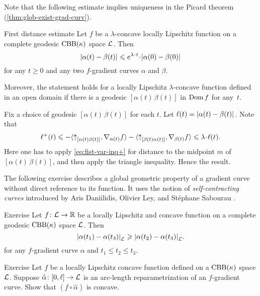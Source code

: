 Note that the following estimate implies uniqueness in the Picard theorem (\ref{thm:glob-exist-grad-curv}).

\begin{thm}{First distance estimate}\label{thm:dist-est}
Let $f$ be a $\lambda$-concave locally Lipschitz function on a complete geodesic $\mathrm{CBB}(\kappa)$ space $\mathcal{L}$.
Then
\[\dist{\alpha(t)}{\beta(t)}{}
\le 
e^{\lambda\cdot t}\cdot\dist[{{}}]{\alpha(0)}{\beta(0)}{}\]
for any $t\ge 0$ and any two $f$-gradient curves $\alpha$ and $\beta$.

Moreover, the statement holds for a locally Lipschitz $\lambda$-concave function defined in an open domain if there is a geodesic $[\alpha(t)\,\beta(t)]$ in $\mathop{\rm Dom}\nolimits f$ for any~$t$.
\end{thm}

Fix a choice of geodesic $[\alpha(t)\,\beta(t)]$ for each $t$.
Let $\ell(t)=\dist{\alpha(t)}{\beta(t)}{}$. 
Note that
\[\ell^+(t)
\le-
\<\dir{\alpha(t)}{\beta(t)},\nabla_{\alpha(t)}f\>-\<\dir{\beta(t)}{\alpha(t)},\nabla_{\beta(t)}f\>
\le
\lambda\cdot\ell(t).\]
Here one has to apply \ref{eq:fist-var-inq+} for distance to the midpoint $m$ of $[\alpha(t)\,\beta(t)]$, and then apply the triangle inequality.
Hence the result. 
\qeds



The following exercise describes a global geometric property of a gradient curve without direct reference to its function.
It uses the notion of \textit{self-contracting curves} introduced by Aris Daniilidis, Olivier Ley, and St\'ephane Sabourau \cite{daniilidis-ley-sabourau}.

\begin{thm}{Exercise}\label{ex:elf-contracting}
Let $f\colon\mathcal{L}\to\mathbb{R}$ be a locally Lipschitz and concave function on a complete geodesic $\mathrm{CBB}(\kappa)$ space
$\mathcal{L}$.
Then 
\[\dist{\alpha(t_1)}{\alpha(t_3)}{\spc{L}}\ge \dist{\alpha(t_2)}{\alpha(t_3)}{\spc{L}}.\]
for any $f$-gradient curve $\alpha$ and $t_1\le t_2\le t_3$.
\end{thm}

\begin{thm}{Exercise}\label{ex:mayer}
Let $f$ be a locally Lipschitz concave function defined on a $\mathrm{CBB}(\kappa)$ space $\mathcal{L}$.
Suppose $\hat\alpha\colon[0,\ell]\to\mathcal{L}$ is an arc-length reparametrization of an $f$-gradient curve.
Show that $(f\circ\hat\alpha)$ is concave.
\end{thm}




